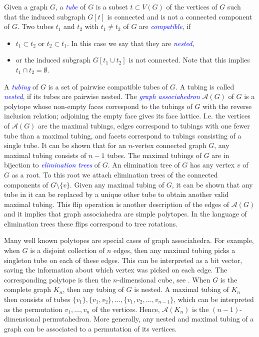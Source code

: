 \documentclass[fontsize=11pt,a4paper,DIV=12]{scrartcl}
\newcommand{\defn}[1]{\textsl{\textcolor{Blue}{#1}}}
\begin{document}
Given a graph $G$, a \defn{tube} of $G$ is a subset $t\subset V(G)$ of the vertices of $G$ such that the induced subgraph $G[t]$ is connected and is not a connected component of $G$. Two tubes $t_1$ and $t_2$ with $t_1\ne t_2$ of $G$ are \defn{compatible}, if
\begin{itemize}
	\item $t_1\subset t_2$ or $t_2\subset t_1$. In this case we say that they are \defn{nested},
	\item or the induced subgraph $G[t_1\cup t_2]$ is not connected. Note that this implies $t_1\cap t_2=\emptyset$.
\end{itemize}
A \defn{tubing} of $G$ is a set of pairwise compatible tubes of $G$. A tubing is called \defn{nested}, if its tubes are pairwise nested. The \defn{graph associahedron} $\mathcal A(G)$ of $G$ is a polytope whose non-empty faces correspond to the tubings of $G$ with the reverse inclusion relation; adjoining the empty face gives its face lattice. I.e. the vertices of $\mathcal A(G)$ are the maximal tubings, edges correspond to tubings with one fewer tube than a maximal tubing, and facets correspond to tubings consisting of a single tube. It can be shown that for an $n$-vertex connected graph $G$, any maximal tubing consists of $n-1$ tubes. The maximal tubings of $G$ are in bijection to \defn{elimination trees} of $G$. An elimination tree of $G$ has any vertex $v$ of $G$ as a root. To this root we attach elimination trees of the connected components of $G\setminus\{v\}$. Given any maximal tubing of $G$, it can be shown that any tube in it can be replaced by a unique other tube to obtain another valid maximal tubing. This flip operation is another description of the edges of $\mathcal A(G)$ and it implies that graph associahedra are simple polytopes. In the language of elimination trees these flips correspond to tree rotations.

Many well known polytopes are special cases of graph associahedra. For example, when $G$ is a disjoint collection of $n$ edges, then any maximal tubing picks a singleton tube on each of these edges. This can be interpreted as a bit vector, saving the information about which vertex was picked on each edge. The corresponding polytope is then the $n$-dimensional cube, see . When $G$ is the complete graph $K_n$, then any tubing of $G$ is nested. A maximal tubing of $K_n$ then consists of tubes $\{v_1\},\{v_1,v_2\},\ldots,\{v_1,v_2,\ldots,v_{n-1}\}$, which can be interpreted as the permutation $v_1,\ldots,v_n$ of the vertices. Hence, $\mathcal A(K_n)$ is the $(n-1)$-dimensional permutahedron. More generally, any nested and maximal tubing of a graph can be associated to a permutation of its vertices.
\end{document}
